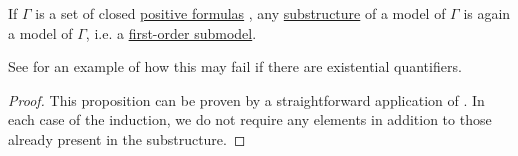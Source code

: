 \begin{proposition}\label{thm:substructure_is_model}
  If \( \Gamma \) is a set of closed \hyperref[def:positive_formula]{positive formulas} , any \hyperref[def:first_order_substructure]{substructure} of a model of \( \Gamma \) is again a model of \( \Gamma \), i.e. a \hyperref[def:first_order_submodel]{first-order submodel}.
\end{proposition}
\begin{comments}
  \item See  for an example of how this may fail if there are existential quantifiers.
\end{comments}
\begin{proof}
  This proposition can be proven by a straightforward application of . In each case of the induction, we do not require any elements in addition to those already present in the substructure.
\end{proof}

